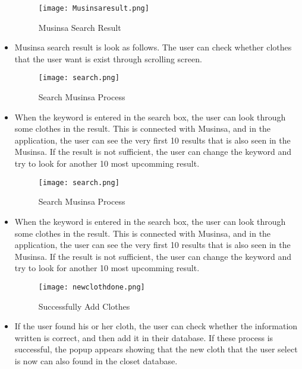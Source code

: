 \documentclass[conference]{IEEEtran}
\begin{document}
    \begin{itemize}
    \begin{figure}[htbp]
    \centerline{\texttt{[image: Musinsaresult.png]}}
    \label{fig}
    \caption{Musinsa Search Result}
    \end{figure}
    \item Musinsa search result is look as follows. The user can check whether clothes that the user want is exist through scrolling screen.\\
    
    \begin{figure}[htbp]
    \centerline{\texttt{[image: search.png]}}
    \label{fig}
    \caption{Search Musinsa Process}
    \end{figure}
    \item When the keyword is entered in the search box, the user can look through some clothes in the result. This is connected with Musinsa, and in the application, the user can see the very first 10 results that is also seen in the Musinsa. If the result is not sufficient, the user can change the keyword and try to look for another 10 most upcomming result.\\
    
        \begin{figure}[htbp]
    \centerline{\texttt{[image: search.png]}}
    \label{fig}
    \caption{Search Musinsa Process}
    \end{figure}
    \item When the keyword is entered in the search box, the user can look through some clothes in the result. This is connected with Musinsa, and in the application, the user can see the very first 10 results that is also seen in the Musinsa. If the result is not sufficient, the user can change the keyword and try to look for another 10 most upcomming result.\\
    
    \newpage
    \begin{figure}[htbp]
    \centerline{\texttt{[image: newclothdone.png]}}
    \label{fig}
    \caption{Successfully Add Clothes}
    \end{figure}
    \item If the user found his or her cloth, the user can check whether the information written is correct, and then add it in their database. If these process is successful, the popup appears showing that the new cloth that the user select is now can also found in the closet database.\\
\end{itemize}
\end{document}
